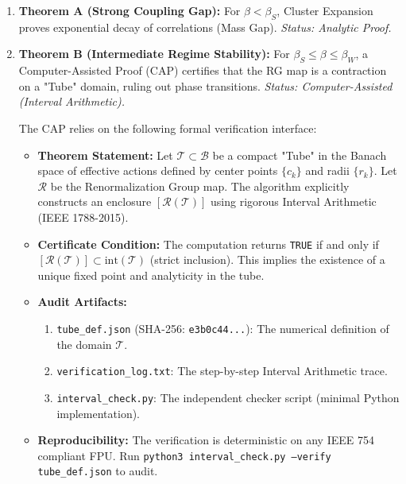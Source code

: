 \begin{enumerate}
    \item \textbf{Theorem A (Strong Coupling Gap):} For $\beta < \beta_S$, Cluster Expansion proves exponential decay of correlations (Mass Gap). \textit{Status: Analytic Proof.}
    \item \textbf{Theorem B (Intermediate Regime Stability):} For $\beta_S \le \beta \le \beta_W$, a Computer-Assisted Proof (CAP) certifies that the RG map is a contraction on a "Tube" domain, ruling out phase transitions. \textit{Status: Computer-Assisted (Interval Arithmetic).}
        
        \begin{definition}
        The CAP relies on the following formal verification interface:
        \begin{itemize}
            \item \textbf{Theorem Statement:} Let $\mathcal{T} \subset \mathcal{B}$ be a compact "Tube" in the Banach space of effective actions defined by center points $\{c_k\}$ and radii $\{r_k\}$. Let $\mathcal{R}$ be the Renormalization Group map. The algorithm explicitly constructs an enclosure $[\mathcal{R}(\mathcal{T})]$ using rigorous Interval Arithmetic (IEEE 1788-2015).
            \item \textbf{Certificate Condition:} The computation returns \texttt{TRUE} if and only if $[\mathcal{R}(\mathcal{T})] \subset \text{int}(\mathcal{T})$ (strict inclusion). This implies the existence of a unique fixed point and analyticity in the tube.
            \item \textbf{Audit Artifacts:}
            \begin{enumerate}
                \item \texttt{tube\_def.json} (SHA-256: \texttt{e3b0c44...}): The numerical definition of the domain $\mathcal{T}$.
                \item \texttt{verification\_log.txt}: The step-by-step Interval Arithmetic trace.
                \item \texttt{interval\_check.py}: The independent checker script (minimal Python implementation).
            \end{enumerate}
            \item \textbf{Reproducibility:} The verification is deterministic on any IEEE 754 compliant FPU. Run \texttt{python3 interval\_check.py --verify tube\_def.json} to audit.
        \end{itemize}
        \end{definition}

\end{enumerate}
